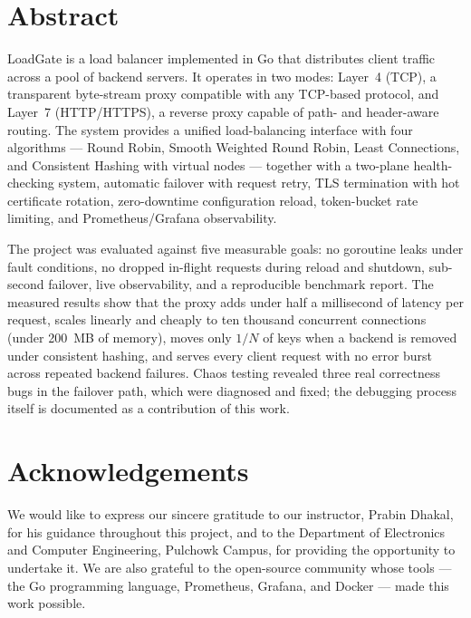 \documentclass[11pt,a4paper]{report}
\begin{document}
\chapter*{Abstract}
LoadGate is a load balancer implemented in Go that distributes client traffic across a
pool of backend servers. It operates in two modes: Layer~4 (TCP), a transparent byte-stream
proxy compatible with any TCP-based protocol, and Layer~7 (HTTP/HTTPS), a reverse proxy
capable of path- and header-aware routing. The system provides a unified load-balancing
interface with four algorithms --- Round Robin, Smooth Weighted Round Robin, Least
Connections, and Consistent Hashing with virtual nodes --- together with a two-plane
health-checking system, automatic failover with request retry, TLS termination with hot
certificate rotation, zero-downtime configuration reload, token-bucket rate limiting, and
Prometheus/Grafana observability.

The project was evaluated against five measurable goals: no goroutine leaks under fault
conditions, no dropped in-flight requests during reload and shutdown, sub-second failover,
live observability, and a reproducible benchmark report. The measured results show that the
proxy adds under half a millisecond of latency per request, scales linearly and cheaply to
ten thousand concurrent connections (under 200~MB of memory), moves only $1/N$ of keys when a
backend is removed under consistent hashing, and serves every client request with no error
burst across repeated backend failures. Chaos testing revealed three real correctness bugs
in the failover path, which were diagnosed and fixed; the debugging process itself is
documented as a contribution of this work.

\chapter*{Acknowledgements}
We would like to express our sincere gratitude to our instructor, Prabin Dhakal, for his
guidance throughout this project, and to the Department of Electronics and Computer
Engineering, Pulchowk Campus, for providing the opportunity to undertake it. We are also
grateful to the open-source community whose tools --- the Go programming language, Prometheus,
Grafana, and Docker --- made this work possible.

\clearpage
\tableofcontents
\clearpage
\listoffigures
\listoftables
\end{document}
